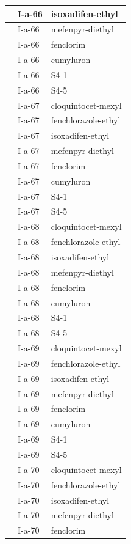 \documentclass[11pt,a4paper]{article}
\begin{document}
\begin{table}[h]
\begin{tabular}{|l|l|l|}
 & I-a-66 & isoxadifen-ethyl \\ \hline
 & I-a-66 & mefenpyr-diethyl \\ \hline
 & I-a-66 & fenclorim \\ \hline
 & I-a-66 & cumyluron \\ \hline
 & I-a-66 & S4-1 \\ \hline
 & I-a-66 & S4-5 \\ \hline
 & I-a-67 & cloquintocet-mexyl \\ \hline
 & I-a-67 & fenchlorazole-ethyl \\ \hline
 & I-a-67 & isoxadifen-ethyl \\ \hline
 & I-a-67 & mefenpyr-diethyl \\ \hline
 & I-a-67 & fenclorim \\ \hline
 & I-a-67 & cumyluron \\ \hline
 & I-a-67 & S4-1 \\ \hline
 & I-a-67 & S4-5 \\ \hline
 & I-a-68 & cloquintocet-mexyl \\ \hline
 & I-a-68 & fenchlorazole-ethyl \\ \hline
 & I-a-68 & isoxadifen-ethyl \\ \hline
 & I-a-68 & mefenpyr-diethyl \\ \hline
 & I-a-68 & fenclorim \\ \hline
 & I-a-68 & cumyluron \\ \hline
 & I-a-68 & S4-1 \\ \hline
 & I-a-68 & S4-5 \\ \hline
 & I-a-69 & cloquintocet-mexyl \\ \hline
 & I-a-69 & fenchlorazole-ethyl \\ \hline
 & I-a-69 & isoxadifen-ethyl \\ \hline
 & I-a-69 & mefenpyr-diethyl \\ \hline
 & I-a-69 & fenclorim \\ \hline
 & I-a-69 & cumyluron \\ \hline
 & I-a-69 & S4-1 \\ \hline
 & I-a-69 & S4-5 \\ \hline
 & I-a-70 & cloquintocet-mexyl \\ \hline
 & I-a-70 & fenchlorazole-ethyl \\ \hline
 & I-a-70 & isoxadifen-ethyl \\ \hline
 & I-a-70 & mefenpyr-diethyl \\ \hline
 & I-a-70 & fenclorim \\ \hline

\end{tabular}
\end{table}
\end{document}

